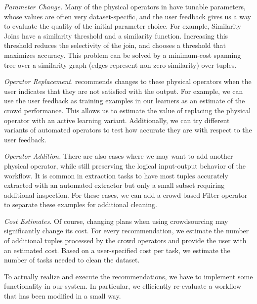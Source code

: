 \textit{Parameter Change.} Many of the physical operators in \sys have tunable parameters, whose values are often very dataset-specific, and the user feedback gives us a way to evaluate the quality of the initial parameter choice. 
For example, Similarity Joins have a similarity threshold and a similarity function. 
Increasing this threshold reduces the selectivity of the join, and \sys chooses a threshold that maximizes accuracy. 
This problem can be solved by a minimum-cost spanning tree over a similarity graph (edges represent non-zero similarity) over tuples.

\vspace{.5em}

\textit{Operator Replacement.} 
\sys recommends changes to these physical operators when the user indicates that they are not satisfied with the output.
For example, we can use the user feedback as training examples in our learners as an estimate of the crowd performance.
This allows us to estimate the value of replacing the physical operator with an active learning variant.
Additionally, we can try different variants of automated operators to test how accurate they are with respect to the user feedback.

\vspace{.5em}

\textit{Operator Addition.}  There are also cases where we may want to add another physical operator, while still preserving the logical input-output behavior of the workflow.
It is common in extraction tasks to have most tuples accurately extracted with an automated extractor but only a small subset requiring additional inspection. 
For these cases, we can add a crowd-based Filter operator to separate these examples for additional cleaning.

\vspace{.5em}

\textit{Cost Estimates.} Of course, changing plans when using crowdsourcing may significantly change its cost.
For every recommendation, we estimate the number of additional tuples processed by the crowd operators and provide the user with an estimated cost.
Based on a user-specified cost per task, we estimate the number of tasks needed to clean the dataset.

\vspace{.5em}

To actually realize and execute the recommendations, we have to implement some functionality in our system.
In particular, we efficiently re-evaluate a workflow that has been modified in a small way.

